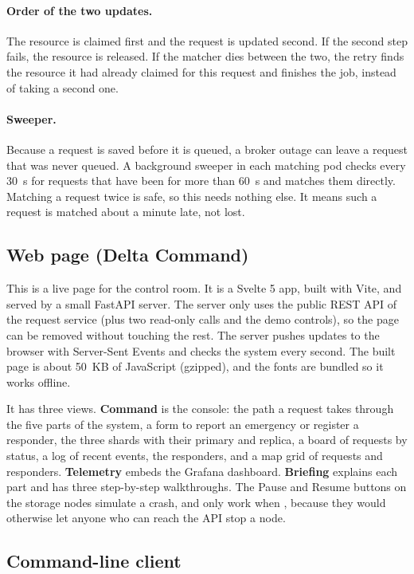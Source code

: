 \documentclass[a4paper,10pt]{article}
\newcommand{\code}[1]{\texttt{\detokenize{#1}}}
\begin{document}
\paragraph{Order of the two updates.} The resource is claimed first and the request is updated
second. If the second step fails, the resource is released. If the matcher dies between the two,
the retry finds the resource it had already claimed for this request and finishes the job,
instead of taking a second one.

\paragraph{Sweeper.} Because a request is saved before it is queued, a broker outage can leave a
request that was never queued. A background sweeper in each matching pod checks every 30~s for
requests that have been \code{PENDING} for more than 60~s and matches them directly. Matching a
request twice is safe, so this needs nothing else. It means such a request is matched about a
minute late, not lost.

\subsection{Web page (Delta Command)}

This is a live page for the control room. It is a Svelte 5 app, built with Vite, and served by a
small FastAPI server. The server only uses the public REST API of the request service (plus two
read-only calls and the demo controls), so the page can be removed without touching the rest.
The server pushes updates to the browser with Server-Sent Events and checks the system every
second. The built page is about 50~KB of JavaScript (gzipped), and the fonts are bundled so it
works offline.

It has three views. \textbf{Command} is the console: the path a request takes through the five
parts of the system, a form to report an emergency or register a responder, the three shards with
their primary and replica, a board of requests by status, a log of recent events, the responders,
and a map grid of requests and responders. \textbf{Telemetry} embeds the Grafana dashboard.
\textbf{Briefing} explains each part and has three step-by-step walkthroughs. The Pause and Resume buttons on
the storage nodes simulate a crash, and only work when \code{DEMO_CONTROLS=true}, because they
would otherwise let anyone who can reach the API stop a node.

\subsection{Command-line client}
\end{document}
